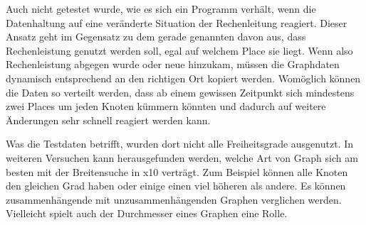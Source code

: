 Auch nicht getestet wurde, wie es sich ein Programm verhält, wenn die Datenhaltung auf eine veränderte Situation der Rechenleitung reagiert. Dieser Ansatz geht im Gegensatz zu dem gerade genannten davon aus, dass Rechenleistung genutzt werden soll, egal auf welchem Place sie liegt. Wenn also Rechenleistung abgegen wurde oder neue hinzukam, müssen die Graphdaten dynamisch entsprechend an den richtigen Ort kopiert werden. Womöglich können die Daten so verteilt werden, dass ab einem gewissen Zeitpunkt sich mindestens zwei Places um jeden Knoten kümmern könnten und dadurch auf weitere Änderungen sehr schnell reagiert werden kann.

Was die Testdaten betrifft, wurden dort nicht alle Freiheitsgrade ausgenutzt. In weiteren Versuchen kann herausgefunden werden, welche Art von Graph sich am besten mit der Breitensuche in x10 verträgt. Zum Beispiel können alle Knoten den gleichen Grad haben oder einige einen viel höheren als andere. Es können zusammenhängende mit unzusammenhängenden Graphen verglichen werden. Vielleicht spielt auch der Durchmesser eines Graphen eine Rolle. 



